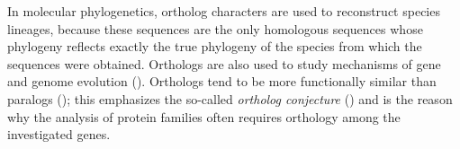 In molecular phylogenetics, ortholog characters are used to reconstruct species
lineages, because these sequences are the only homologous sequences whose
phylogeny reflects exactly the true phylogeny of the species from which the
sequences were obtained. Orthologs are also used to study mechanisms of gene and
genome evolution (\cite{dessimoz2012}). Orthologs tend to be more functionally
similar than paralogs (\cite{altenhoff2012}); this emphasizes the so-called
\emph{ortholog conjecture} (\cite{tatusov1997}) and is the reason why the
analysis of protein families often requires orthology among the investigated
genes.

